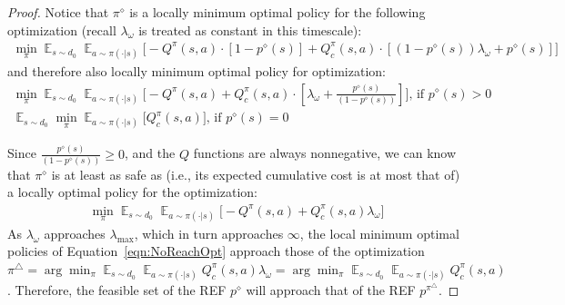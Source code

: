 \documentclass{article}
\theoremstyle{definition}
\DeclareMathOperator*{\E}{\mathbb{E}}
\begin{document}
\begin{proof}
Notice that $\pi^\diamond$ is a locally minimum optimal policy for the following optimization (recall $\lambda_\omega$ is treated as constant in this timescale):
\begin{align*}
    \min_{\pi} \E_{s\sim d_0} \E_{a\sim \pi(\cdot | s)}\bigg[-Q^{\pi}(s,a)\cdot [1 - p^{\diamond}(s)] + Q^{\pi}_c(s,a)\cdot [(1 - p^{\diamond}(s))\lambda_\omega + p^{\diamond}(s)]\bigg]   
\end{align*}
and therefore also locally minimum optimal policy for optimization:
\begin{align*}
    \min_{\pi}\E_{s\sim d_0}\E_{a\sim \pi(\cdot | s)}\bigg[-Q^{\pi}(s,a) + Q^{\pi}_c(s,a)\cdot [\lambda_\omega + \frac{p^{\diamond}(s)}{(1 - p^{\diamond}(s))}]\bigg] \text{, if } p^{\diamond}(s) > 0\\
    \E_{s\sim d_0}\min_{\pi}\E_{a\sim \pi(\cdot | s)}\bigg[Q^{\pi}_c(s,a)\bigg] \text{, if } p^{\diamond}(s) = 0
\end{align*}

Since $\frac{p^{\diamond}(s)}{(1 - p^{\diamond}(s))} \geq 0$, and the $Q$ functions are always nonnegative, we can know that $\pi^\diamond$ is at least as safe as (i.e., its expected cumulative cost is at most that of) a locally optimal policy for the optimization:
\begin{align}
\label{eqn:NoReachOpt}
    \min_{\pi} \E_{s\sim d_0}\E_{a\sim \pi(\cdot | s)}\bigg[ -Q^{\pi}(s,a) + Q^{\pi}_c(s,a)\lambda_\omega\bigg]
\end{align}
As $\lambda_\omega$ approaches $\lambda_{\max}$, which in turn approaches $\infty$, the local minimum optimal policies of Equation~\ref{eqn:NoReachOpt} approach those of the optimization $\pi^\bigtriangleup = \arg\min_\pi \E_{s\sim d_0}\E_{a\sim \pi(\cdot | s)} Q^{\pi}_c(s,a)\lambda_\omega=\arg\min_\pi \E_{s\sim d_0}\E_{a\sim \pi(\cdot | s)} Q^{\pi}_c(s,a)$. Therefore, the feasible set of the REF $p^{\diamond}$ will approach that of the REF $p^{\pi^\bigtriangleup}$.


\end{proof}
\end{document}
